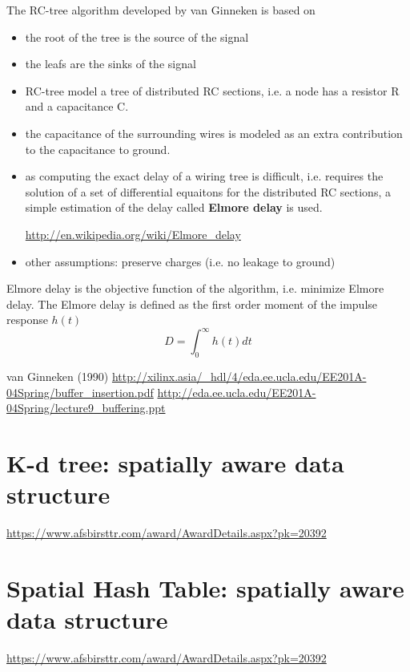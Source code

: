 The RC-tree algorithm developed by van Ginneken is based on 
\begin{itemize}
  \item the root of the tree is the source of the signal
  \item the leafs are the sinks of the signal
  \item RC-tree model a tree of distributed RC sections, i.e. a node has a resistor R and a capacitance C.
  
  \item the capacitance of the surrounding wires is modeled as an extra contribution to the capacitance to ground.
  \item as computing the exact delay of a wiring tree is difficult, i.e. requires the solution of a set of differential equaitons for the distributed RC sections, a simple estimation of the delay called {\bf Elmore delay} is used.
  
  \url{http://en.wikipedia.org/wiki/Elmore_delay}
  
  \item other assumptions: preserve charges (i.e. no leakage to ground)  
\end{itemize}
Elmore delay is the objective function of the algorithm, i.e. minimize Elmore delay. The Elmore delay is defined as the first order moment of the impulse response $h(t)$
\begin{equation}
D = \int^\infty_0 h(t)dt
\end{equation}




van Ginneken (1990) \url{http://xilinx.asia/_hdl/4/eda.ee.ucla.edu/EE201A-04Spring/buffer_insertion.pdf}
\url{http://eda.ee.ucla.edu/EE201A-04Spring/lecture9_buffering.ppt}


\section{K-d tree: spatially aware data structure}

\url{https://www.afsbirsttr.com/award/AwardDetails.aspx?pk=20392}

\section{Spatial Hash Table: spatially aware data structure}

\url{https://www.afsbirsttr.com/award/AwardDetails.aspx?pk=20392}